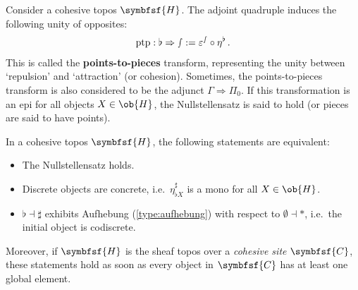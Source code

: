 
    \begin{property}[Nullstellensatz]
        Consider a cohesive topos $\symbfsf{H}$. The adjoint quadruple induces the following unity of opposites:
        \begin{gather*}
            \mathrm{ptp}:\flat\Rightarrow\smallint := \varepsilon^{\smallint}\circ\eta^\flat\,.
        \end{gather*}
        This is called the \textbf{points-to-pieces} transform, representing the unity between `repulsion' and `attraction' (or cohesion). Sometimes, the points-to-pieces transform is also considered to be the adjunct $\Gamma\Rightarrow\Pi_0$. If this transformation is an epi for all objects $X\in\ob{H}$, the Nullstellensatz is said to hold (or pieces are said to have points).
    \end{property}
    \begin{property}\label{topos:nullstellensatz}
        In a cohesive topos $\symbfsf{H}$, the following statements are equivalent:
        \begin{itemize}
            \item The Nullstellensatz holds.
            \item Discrete objects are concrete, i.e.~$\eta^\sharp_{\flat X}$ is a mono for all $X\in\ob{H}$.
            \item $\flat\dashv\sharp$ exhibits Aufhebung (\cref{type:aufhebung}) with respect to $\emptyset\dashv\ast$, i.e.~the initial object is codiscrete.
        \end{itemize}
        Moreover, if $\symbfsf{H}$ is the sheaf topos over a \textit{cohesive site} $\symbfsf{C}$, these statements hold as soon as every object in $\symbfsf{C}$ has at least one global element.
    \end{property}

